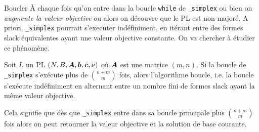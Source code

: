 \documentclass[aspectratio = 169]{beamer}
\begin{document}
\begin{frame}{Boucler}
  À chaque fois qu'on entre dans la boucle \texttt{while}
  de \texttt{_simplex} ou bien on \textit{augmente la
    valeur objective} ou alors on découvre que le PL est non-majoré. A
  priori, \texttt{_simplex} pourrait s'executer
  indéfiniment, en itérant entre des formes slack équivalentes ayant
  une valeur objective constante. On va chercher à étudier ce
  phénomène.
  \pause
    \begin{prop}[\textbf{C}]
      Soit $L$ un PL $(N, B, \boldsymbol{A}, \boldsymbol{b}, \boldsymbol{c}, \nu)$ où $\boldsymbol{A}$
      est une matrice $(m, n)$. Si la boucle de
      \texttt{_simplex} s'exécute plus de $\binom{n+m}{m}$
      fois, alors l'algorithme boucle, i.e. la boucle s'exécute
      indéfiniment en alternant entre un nombre fini de formes slack
      ayant la même valeur objective.
    \end{prop}
    \begin{rem}
      Cela signifie que dès que \texttt{_simplex} entre
      dans sa boucle principale plus $\binom{n+m}{m}$ fois alors on
      peut retourner la valeur objective et la solution de base
      courante.
    \end{rem}
    \end{frame}

\end{document}
